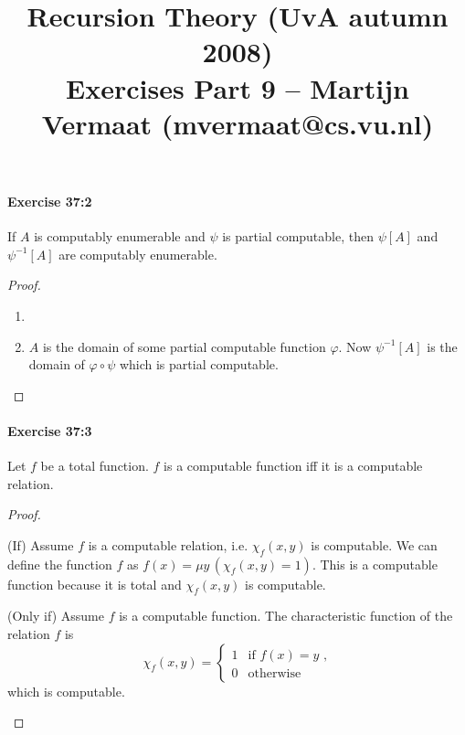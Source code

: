 \documentclass[a4paper,11pt]{article}
\title{Recursion Theory (UvA autumn 2008)\\
\normalsize{Exercises Part 9 -- Martijn Vermaat (mvermaat@cs.vu.nl)}}
\date{}
\begin{document}
\maketitle


\paragraph{Exercise 37:2}

If $A$ is computably enumerable and $\psi$ is partial computable, then $\psi[A]$ and $\psi^{-1}[A]$ are computably enumerable.

\begin{proof}
\begin{enumerate}[label=(\roman*)]
  \item
  \item
    $A$ is the domain of some partial computable function $\varphi$.
    Now $\psi^{-1}[A]$ is the domain of $\varphi \circ \psi$ which is partial computable.
    \qedhere
\end{enumerate}
\end{proof}


\paragraph{Exercise 37:3}

Let $f$ be a total function. $f$ is a computable function iff it is a computable relation.

\begin{proof}
\begin{description}
  \item{(If)}
    Assume $f$ is a computable relation, i.e. $\chi_f(x, y)$ is computable.
    We can define the function $f$ as $f(x) = \mu y \, (\chi_f(x, y) = 1)$.
    This is a computable function because it is total and $\chi_f(x, y)$ is computable.
  \item{(Only if)}
    Assume $f$ is a computable function.
    The characteristic function of the relation $f$ is
    \begin{equation*}
      \chi_f(x, y) = \begin{cases}
        1 & \text{if $f(x) = y$ ,}\\
        0 & \text{otherwise}
      \end{cases}
    \end{equation*}
    which is computable.
    \qedhere
\end{description}
\end{proof}
\end{document}
